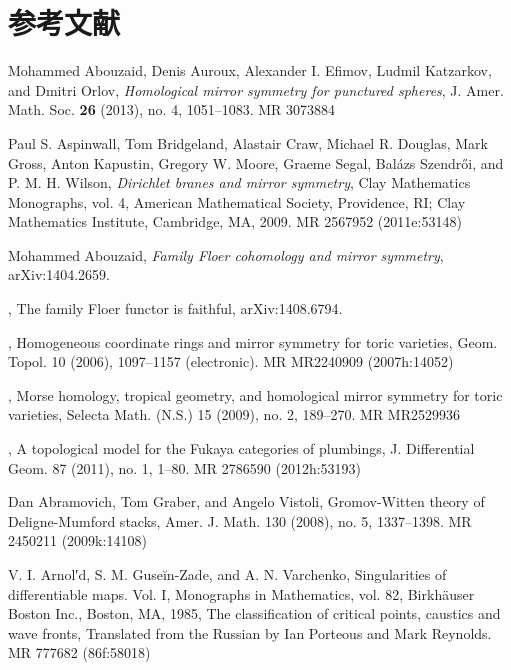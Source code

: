 \clearpage
\section*{参考文献}
{\small
\setlength{\parindent}{0pt}
\begin{list}{}{%
  \setlength{\leftmargin}{3.4em}%
  \setlength{\itemindent}{-3.4em}%
  \setlength{\itemsep}{1.5pt}%
  \setlength{\parsep}{0pt}%
  \setlength{\listparindent}{0pt}%
}
\item[{[AAE+13]}] Mohammed Abouzaid, Denis Auroux, Alexander I. Efimov, Ludmil Katzarkov, and Dmitri Orlov, \textit{Homological mirror symmetry for punctured spheres}, J. Amer. Math. Soc. \textbf{26} (2013), no. 4, 1051--1083. MR 3073884
\item[{[ABC+09]}] Paul S. Aspinwall, Tom Bridgeland, Alastair Craw, Michael R. Douglas, Mark Gross, Anton Kapustin, Gregory W. Moore, Graeme Segal, Balázs Szendrői, and P. M. H. Wilson, \textit{Dirichlet branes and mirror symmetry}, Clay Mathematics Monographs, vol. 4, American Mathematical Society, Providence, RI; Clay Mathematics Institute, Cambridge, MA, 2009. MR 2567952 (2011e:53148)
\item[{[Aboa]}] Mohammed Abouzaid, \textit{Family Floer cohomology and mirror symmetry}, arXiv:1404.2659.
\item[{[Abob]}] , The family Floer functor is faithful, arXiv:1408.6794.
\item[{[Abo06]}] , Homogeneous coordinate rings and mirror symmetry for toric varieties, Geom. Topol. 10 (2006), 1097--1157 (electronic). MR MR2240909 (2007h:14052)
\item[{[Abo09]}] , Morse homology, tropical geometry, and homological mirror symmetry for toric varieties, Selecta Math. (N.S.) 15 (2009), no. 2, 189--270. MR MR2529936
\item[{[Abo11]}] , A topological model for the Fukaya categories of plumbings, J. Differential Geom. 87 (2011), no. 1, 1--80. MR 2786590 (2012h:53193)
\item[{[AGV08]}] Dan Abramovich, Tom Graber, and Angelo Vistoli, Gromov-Witten theory of Deligne-Mumford stacks, Amer. J. Math. 130 (2008), no. 5, 1337--1398. MR 2450211 (2009k:14108)
\item[{[AGZV85]}] V. I. Arnol′d, S. M. Guseĭn-Zade, and A. N. Varchenko, Singularities of differentiable maps. Vol. I, Monographs in Mathematics, vol. 82, Birkhäuser Boston Inc., Boston, MA, 1985, The classification of critical points, caustics and wave fronts, Translated from the Russian by Ian Porteous and Mark Reynolds. MR 777682 (86f:58018)

\end{list}}
